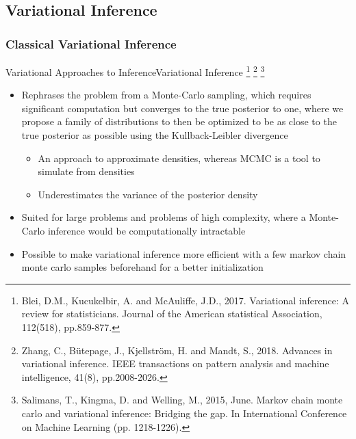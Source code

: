 \documentclass[AERbeamer%
              ,optEnglish%
              ,optBiber%
              ,optBibstyleAlphabetic%
              ,optBeamerClassicFormat%
              ]{AERlatex}%
\begin{document}
\subsection{Variational Inference}

\subsubsection*{Classical Variational Inference}
\begin{frame}[c]{Variational Approaches to Inference}{Variational Inference \footnote{Blei, D.M., Kucukelbir, A. and McAuliffe, J.D., 2017. Variational inference: A
                                                                                      review for statisticians. Journal of the American statistical Association, 112(518),
                                                                                      pp.859-877.}
                                                                            \footnote{Zhang, C., Bütepage, J., Kjellström, H. and Mandt, S., 2018. Advances in variational inference.
                                                                                      IEEE transactions on pattern analysis and machine intelligence, 41(8), pp.2008-2026.}
                                                                            \footnote{Salimans, T., Kingma, D. and Welling, M., 2015, June. Markov chain monte carlo and variational
                                                                                      inference: Bridging the gap. In International Conference on Machine Learning (pp. 1218-1226).}}
    \centering
    \begin{itemize}
        \item Rephrases the problem from a Monte-Carlo sampling, which requires significant computation but converges to the true posterior to one,
              where we propose a family of distributions to then be optimized to be as close to the true posterior as possible using the Kullback-Leibler
              divergence
        \begin{itemize}
            \item An approach to approximate densities, whereas MCMC is a tool to simulate from densities
            \item Underestimates the variance of the posterior density
        \end{itemize}
        \item Suited for large problems and problems of high complexity, where a Monte-Carlo inference would be computationally intractable
        \item Possible to make variational inference more efficient with a few markov chain monte carlo samples beforehand for a better initialization
    \end{itemize}
\end{frame}
\end{document}

